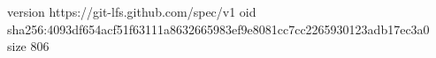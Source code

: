 version https://git-lfs.github.com/spec/v1
oid sha256:4093df654acf51f63111a8632665983ef9e8081cc7cc2265930123adb17ec3a0
size 806
